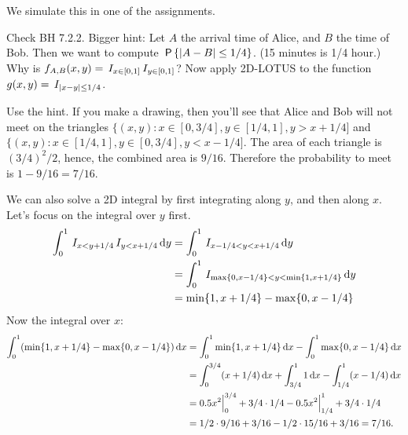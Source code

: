 

\setcounter{theorem}{0}
\begin{exercise}[BH.7.1]
We simulate this in one of the assignments.
\begin{hint}
Check BH 7.2.2. Bigger hint: Let $A$ the arrival time of Alice, and $B$ the time of Bob. Then we want to compute $\P{|A-B|\leq 1/4}$.  (15 minutes is 1/4 hour.)  Why is $f_{A,B}(x,y) = \1{x\in[0,1]}\1{y\in [0,1]}$? Now apply 2D-LOTUS to the function $g(x,y) = \1{|x-y|\leq 1/4}$.
\end{hint}
\begin{solution}
Use the hint. If you make a drawing, then you'll see that Alice and Bob will not meet on the triangles
$\{(x,y) : x\in [0, 3/4], y\in [1/4, 1], y>x+1/4]$ and $\{(x,y) : x\in [1/4, 1], y\in [0, 3/4], y<x-1/4]$. The area of each triangle is $(3/4)^{2}/2$, hence, the combined area is $9/16$. Therefore the probability to meet is $1-9/16=7/16$.

We can also solve   a 2D integral by first integrating along $y$, and then along $x$. Let's focus on the integral over $y$ first.
\begin{align*}
\int_0^1 \1{x<y+1/4}\1{y<x+1/4} \d y
&=\int_0^1 \1{x-1/4<y<x+1/4} \d y \\
&=\int_0^1 \1{\max\{0, x-1/4\} <y < \min\{1,x+1/4\}} \d y \\
&= \min\{1,x+1/4\} - \max\{0, x-1/4\}
\end{align*}
Now the integral over $x$:
\begin{align*}
  \int_0^1 (\min\{1,x+1/4\} - \max\{0, x-1/4\}) \d x
&=  \int_0^1 \min\{1,x+1/4\}\d x - \int_0^{1}\max\{0, x-1/4\} \d x  \\
&=  \int_0^{3/4}(x+1/4)\d x + \int_{3/4}^{1}1 \d x
 - \int_{1/4}^{1}(x-1/4) \d x \\
  &=0.5 x^2\Big|_{0}^{3/4} + 3/4\cdot 1/4 - 0.5x^2\Big|_{1/4}^1 + 3/4\cdot 1/4 \\
  &= 1/2\cdot 9/16 + 3/16 - 1/2\cdot 15/16 + 3/16 = 7/16.
\end{align*}

\end{solution}
\end{exercise}



